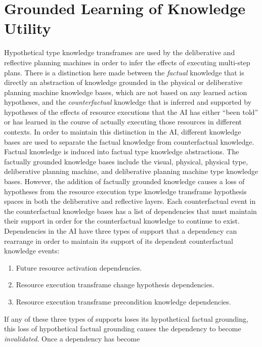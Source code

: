 \chapter{Grounded Learning of Knowledge Utility}
\label{chapter:grounded_learning_of_knowledge_utility}

Hypothetical type knowledge transframes are used by the deliberative
and reflective planning machines in order to infer the effects of
executing multi-step plans.  There is a distinction here made between
the \emph{factual} knowledge that is directly an abstraction of
knowledge grounded in the physical or deliberative planning machine
knowledge bases, which are not based on any learned action hypotheses,
and the \emph{counterfactual} knowledge that is inferred and supported
by hypotheses of the effects of resource executions that the AI has
either ``been told'' or has learned in the course of actually
executing those resources in different contexts.  In order to maintain
this distinction in the AI, different knowledge bases are used to
separate the factual knowledge from counterfactual knowledge.  Factual
knowledge is induced into factual type knowledge abstractions.  The
factually grounded knowledge bases include the visual, physical,
physical type, deliberative planning machine, and deliberative
planning machine type knowledge bases.  However, the addition of
factually grounded knowledge causes a loss of hypotheses from the
resource execution type knowledge transframe hypothesis spaces in both
the deliberative and reflective layers.  Each counterfactual event in
the counterfactual knowledge bases has a list of dependencies that
must maintain their support in order for the counterfactual knowledge
to continue to exist.  Dependencies in the AI have three types of
support that a dependency can rearrange in order to maintain its
support of its dependent counterfactual knowledge events:
\begin{enumerate}
\item Future resource activation dependencies.
\item Resource execution transframe change hypothesis dependencies.
\item Resource execution transframe precondition knowledge dependencies.
\end{enumerate}
If any of these three types of supports loses its hypothetical factual
grounding, this loss of hypothetical factual grounding causes the
dependency to become \emph{invalidated}.  Once a dependency has become
